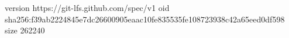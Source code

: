 version https://git-lfs.github.com/spec/v1
oid sha256:f39ab2224845e7dc26600905eaac10fe835535fe108723938c42a65eed0df598
size 262240
